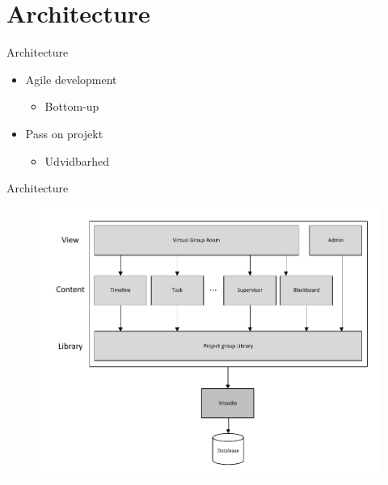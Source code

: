 \section{Architecture}
\begin{frame}{Architecture}
\begin{itemize}
	\item Agile development
	\begin{itemize}
		\item Bottom-up  
	\end{itemize}
	\item Pass on projekt
	\begin{itemize}
		\item Udvidbarhed
	\end{itemize}
	
\end{itemize}
\end{frame}


\begin{frame}{Architecture}
\begin{figure}%
\includegraphics[width=\columnwidth]{input/assets/architecture}%
\end{figure}	
\end{frame}